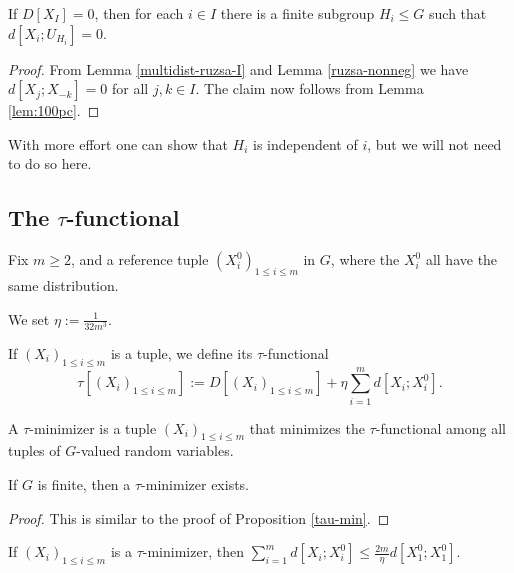 \begin{proposition}[Vanishing]\label{multi-zero}
If $D[X_I]=0$, then for each $i \in I$ there is a finite subgroup $H_i \leq G$ such that $d[X_i; U_{H_i}] = 0$.
\end{proposition}

\begin{proof}  From Lemma \ref{multidist-ruzsa-I} and Lemma \ref{ruzsa-nonneg} we have $d[X_j; X_{-k}]=0$ for all $j,k \in I$.  The claim now follows from Lemma \ref{lem:100pc}.
\end{proof}

With more effort one can show that $H_i$ is independent of $i$, but we will not need to do so here.

\subsection{The $\tau$-functional}

Fix $m \geq 2$, and a reference tuple $(X^0_i)_{1 \leq i \leq m}$ in $G$, where the $X^0_i$ all have the same distribution.

\begin{definition}[$\eta$]\label{eta-def-multi}
We set $\eta := \frac{1}{32m^3}$.
\end{definition}

\begin{definition}\label{tau-def-multi}  If $(X_i)_{1 \leq i \leq m}$ is a tuple, we define its $\tau$-functional
$$ \tau[ (X_i)_{1 \leq i \leq m}] := D[(X_i)_{1 \leq i \leq m}] + \eta \sum_{i=1}^m d[X_i; X^0_i].$$
\end{definition}

\begin{definition}\label{tau-min-multi}  A $\tau$-minimizer is a tuple $(X_i)_{1 \leq i \leq m}$ that minimizes the $\tau$-functional among all tuples of $G$-valued random variables.
\end{definition}

\begin{proposition}\label{tau-min-exist-multi}  If $G$ is finite, then a $\tau$-minimizer exists.
\end{proposition}

\begin{proof} This is similar to the proof of Proposition \ref{tau-min}.
\end{proof}

\begin{proposition}\label{tau-ref}  If $(X_i)_{1 \leq i \leq m}$ is a $\tau$-minimizer, then $\sum_{i=1}^m d[X_i; X^0_i] \leq \frac{2m}{\eta} d[X^0_1; X^0_1]$.
\end{proposition}

